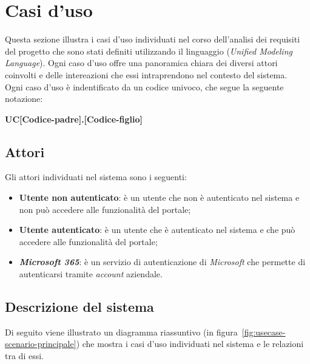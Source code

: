 \section{Casi d'uso}\label{sec:usecase}
Questa sezione illustra i casi d'uso individuati nel corso dell'analisi dei requisiti del progetto che sono stati definiti utilizzando il linguaggio  (\textit{Unified Modeling Language}).
Ogni caso d'uso offre una panoramica chiara dei diversi attori coinvolti e delle intereazioni che essi intraprendono nel contesto del sistema.\\
Ogni caso d'uso è indentificato da un codice univoco, che segue la seguente notazione:

\begin{center}
    \textbf{UC[Codice-padre].[Codice-figlio]}
  \end{center}

\subsection{Attori}
Gli attori individuati nel sistema sono i seguenti:
\begin{itemize}
    \item \textbf{Utente non autenticato}: è un utente che non è autenticato nel sistema e non può accedere alle funzionalità del portale;
    \item \textbf{Utente autenticato}: è un utente che è autenticato nel sistema e che può accedere alle funzionalità del portale;
    \item \textbf{\textit{Microsoft 365}}: è un servizio di autenticazione di \textit{Microsoft} che permette di autenticarsi tramite \textit{\textit{account}} aziendale.

\end{itemize}

\clearpage

\subsection{Descrizione del sistema}

Di seguito viene illustrato un diagramma riassuntivo (in figura~\ref{fig:usecase-scenario-principale}) che mostra i casi d'uso individuati nel sistema e le relazioni tra di essi.


